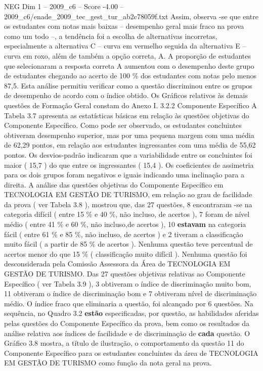 \begin{textsample}{NEG Dim 1 – 2009\_c6 – Score -4.00 – 2009\_c6/enade\_2009\_tec\_gest\_tur\_ab2c78059f.txt}
Assim, observa -se que entre os estudantes com notas mais baixas – desempenho geral mais fraco na prova como um todo –, a tendência foi a escolha de alternativas incorretas, especialmente a alternativa C – curva em vermelho seguida da alternativa E – curva em roxo, além de também a opção correta, A.
A proporção de estudantes que selecionaram a resposta correta A aumentou com o desempenho deste grupo de estudantes chegando ao acerto de 100 \% dos estudantes com notas pelo menos 87,5.
Esta análise permitiu verificar como a questão discriminou entre os grupos de desempenho de acordo com o índice obtido.
Os Gráficos relativos às demais questões de Formação Geral constam do Anexo I. 3.2.2 Componente Específico A Tabela 3.7 apresenta as estatísticas básicas em relação às questões objetivas do Componente Específico.
Como pode ser observado, os estudantes concluintes obtiveram desempenho superior, mas por uma pequena margem com uma média de 62,29 pontos, em relação aos estudantes ingressantes com uma média de 55,62 pontos.
Os desvios-padrão indicaram que a variabilidade entre os concluintes foi maior ( 15,7 ) do que entre os ingressantes ( 15,4 ).
Os coeficientes de assimetria para os dois grupos foram negativos e iguais indicando uma inclinação para a direita.
A análise das questões objetivas do Componente Específico em TECNOLOGIA EM GESTÃO DE TURISMO, em relação ao grau de facilidade da prova ( ver Tabela 3.8 ), mostrou que, das 27 questões, 8 encontraram -se na categoria difícil ( entre 15 \% e 40 \%, não incluso, de acertos ), 7 foram de nível médio ( entre 41 \% e 60 \%, não incluso,de acertos ), 10 \textbf{estavam} na categoria fácil ( entre 61 \% e 85 \%, não incluso, de acertos ) e 2 tiveram a classificação muito fácil ( a partir de 85 \% de acertos ).
Nenhuma questão teve percentual de acertos menor do que 15 \% ( classificação muito difícil ).
Nenhuma questão foi desconsiderada pela Comissão Assessora da Área de TECNOLOGIA EM GESTÃO DE TURISMO.
Das 27 questões objetivas relativas ao Componente Específico ( ver Tabela 3.9 ), 3 obtiveram o índice de discriminação muito bom, 11 obtiveram o índice de discriminação bom e 7 obtiveram nível de discriminação médio.
O índice fraco que eliminaria a questão, foi alcançado por 6 questões.
Na sequência, no Quadro 3.2 \textbf{estão} especificadas, por questão, as habilidades aferidas pelas questões do Componente Específico da prova, bem como os resultados da análise relativa aos índices de facilidade e de discriminação de \textbf{cada} questão.
O Gráfico 3.8 mostra, a título de ilustração, o comportamento da questão 11 do Componente Específico para os estudantes concluintes da área de TECNOLOGIA EM GESTÃO DE TURISMO como função da nota geral na prova.

\end{textsample}
